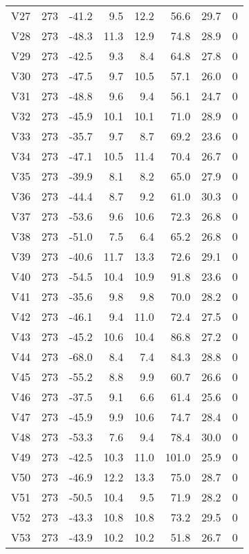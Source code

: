 {\begin{longtable}{lrrrrrrr}
  V27 & 273 & -41.2 &  9.5 & 12.2 &  56.6 & 29.7 & 0 \\ 
  V28 & 273 & -48.3 & 11.3 & 12.9 &  74.8 & 28.9 & 0 \\ 
  V29 & 273 & -42.5 &  9.3 &  8.4 &  64.8 & 27.8 & 0 \\ 
  V30 & 273 & -47.5 &  9.7 & 10.5 &  57.1 & 26.0 & 0 \\ 
  V31 & 273 & -48.8 &  9.6 &  9.4 &  56.1 & 24.7 & 0 \\ 
  V32 & 273 & -45.9 & 10.1 & 10.1 &  71.0 & 28.9 & 0 \\ 
  V33 & 273 & -35.7 &  9.7 &  8.7 &  69.2 & 23.6 & 0 \\ 
  V34 & 273 & -47.1 & 10.5 & 11.4 &  70.4 & 26.7 & 0 \\ 
  V35 & 273 & -39.9 &  8.1 &  8.2 &  65.0 & 27.9 & 0 \\ 
  V36 & 273 & -44.4 &  8.7 &  9.2 &  61.0 & 30.3 & 0 \\ 
  V37 & 273 & -53.6 &  9.6 & 10.6 &  72.3 & 26.8 & 0 \\ 
  V38 & 273 & -51.0 &  7.5 &  6.4 &  65.2 & 26.8 & 0 \\ 
  V39 & 273 & -40.6 & 11.7 & 13.3 &  72.6 & 29.1 & 0 \\ 
  V40 & 273 & -54.5 & 10.4 & 10.9 &  91.8 & 23.6 & 0 \\ 
  V41 & 273 & -35.6 &  9.8 &  9.8 &  70.0 & 28.2 & 0 \\ 
  V42 & 273 & -46.1 &  9.4 & 11.0 &  72.4 & 27.5 & 0 \\ 
  V43 & 273 & -45.2 & 10.6 & 10.4 &  86.8 & 27.2 & 0 \\ 
  V44 & 273 & -68.0 &  8.4 &  7.4 &  84.3 & 28.8 & 0 \\ 
  V45 & 273 & -55.2 &  8.8 &  9.9 &  60.7 & 26.6 & 0 \\ 
  V46 & 273 & -37.5 &  9.1 &  6.6 &  61.4 & 25.6 & 0 \\ 
  V47 & 273 & -45.9 &  9.9 & 10.6 &  74.7 & 28.4 & 0 \\ 
  V48 & 273 & -53.3 &  7.6 &  9.4 &  78.4 & 30.0 & 0 \\ 
  V49 & 273 & -42.5 & 10.3 & 11.0 & 101.0 & 25.9 & 0 \\ 
  V50 & 273 & -46.9 & 12.2 & 13.3 &  75.0 & 28.7 & 0 \\ 
  V51 & 273 & -50.5 & 10.4 &  9.5 &  71.9 & 28.2 & 0 \\ 
  V52 & 273 & -43.3 & 10.8 & 10.8 &  73.2 & 29.5 & 0 \\ 
  V53 & 273 & -43.9 & 10.2 & 10.2 &  51.8 & 26.7 & 0 \\ 

\end{longtable}}
